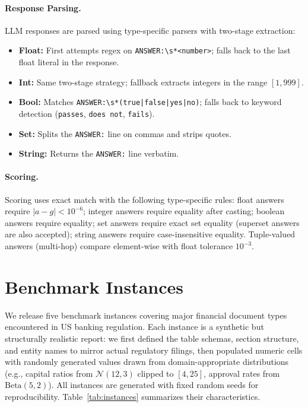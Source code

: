 \documentclass[11pt]{article}
\begin{document}
\paragraph{Response Parsing.}
LLM responses are parsed using type-specific parsers with two-stage
extraction:
\begin{itemize}[leftmargin=2em]
  \item \textbf{Float:}  First attempts regex on \texttt{ANSWER:\textbackslash s*<number>};
    falls back to the last float literal in the response.
  \item \textbf{Int:}  Same two-stage strategy; fallback extracts
    integers in the range $[1, 999]$.
  \item \textbf{Bool:}  Matches \texttt{ANSWER:\textbackslash s*(true|false|yes|no)};
    falls back to keyword detection (\texttt{passes}, \texttt{does not},
    \texttt{fails}).
  \item \textbf{Set:}  Splits the \texttt{ANSWER:} line on commas and
    strips quotes.
  \item \textbf{String:}  Returns the \texttt{ANSWER:} line verbatim.
\end{itemize}

\paragraph{Scoring.}
Scoring uses exact match with the following type-specific rules:
float answers require $|a - g| < 10^{-6}$;
integer answers require equality after casting;
boolean answers require equality;
set answers require exact set equality (superset answers are also
accepted);
string answers require case-insensitive equality.
Tuple-valued answers (multi-hop) compare element-wise with float
tolerance $10^{-3}$.

\section{Benchmark Instances}
\label{sec:instances}

We release five benchmark instances covering major financial document types
encountered in US banking regulation.  Each instance is a synthetic but
structurally realistic report: we first defined the table schemas, section
structure, and entity names to mirror actual regulatory filings, then
populated numeric cells with randomly generated values drawn from
domain-appropriate distributions (e.g., capital ratios from
$\mathcal{N}(12, 3)$ clipped to $[4, 25]$, approval rates from
$\text{Beta}(5, 2)$).  All instances are generated with fixed random
seeds for reproducibility.
Table~\ref{tab:instances} summarizes their characteristics.
\end{document}

